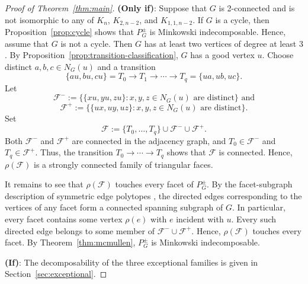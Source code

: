 \documentclass[11pt,a4paper]{amsart}
\theoremstyle{definition}
\theoremstyle{remark}
\newcommand{\Fc}{{\mathcal F}}
\begin{document}
{\begin{proof}[Proof of Theorem~\ref{thm:main}]
{\bf (Only if)}: 
Suppose that $G$ is 2-connected and is not isomorphic to any of $K_n$, $K_{2,n-2}$, and $K_{1,1,n-2}$.
If $G$ is a cycle, then Proposition~\ref{prop:cycle} shows that $P_G^{\pm}$ is Minkowski indecomposable. 
Hence, assume that $G$ is not a cycle. Then $G$ has at least two vertices of degree at least $3$. 
By Proposition~\ref{prop:transition-classification}, $G$ has a good vertex $u$. 
Choose distinct $a,b,c\in N_G(u)$ and a transition \[\{au,bu,cu\}=T_0\to T_1\to\cdots\to T_q=\{ua,ub,uc\}.\]
Let
\[\Fc^-:=\{\{xu,yu,zu\}:x,y,z\in N_G(u) \text{ are distinct}\} \text{ and}\]
\[\Fc^+:=\{\{ux,uy,uz\}:x,y,z\in N_G(u) \text{ are distinct}\}.\]
Set
\[\Fc:=\{T_0,\ldots,T_q\}\cup\Fc^-\cup\Fc^+.\]
Both $\Fc^-$ and $\Fc^+$ are connected in the adjacency graph, and
$T_0\in\Fc^-$ and $T_q\in\Fc^+$. 
Thus, the transition
$T_0\to\cdots\to T_q$ shows that $\Fc$ is connected.
Hence, $\rho(\Fc)$ is a strongly connected family of triangular faces. 

It remains to see that $\rho(\Fc)$ touches every facet of $P_G^{\pm}$. 
By the facet-subgraph description of symmetric edge polytopes \cite[Theorem~3(2)]{CDK}, 
the directed edges corresponding to the vertices of any facet form a connected spanning subgraph of $G$. 
In particular, every facet contains some vertex $\rho(e)$ with $e$ incident with $u$. 
Every such directed edge belongs to some member of $\Fc^-\cup\Fc^+$.
Hence, $\rho(\Fc)$ touches every facet. 
By Theorem~\ref{thm:mcmullen}, $P_G^{\pm}$ is Minkowski indecomposable. 

\noindent
{\bf (If)}: The decomposability of the three exceptional families is given in Section~\ref{sec:exceptional}. 
\end{proof}

}
\end{document}

